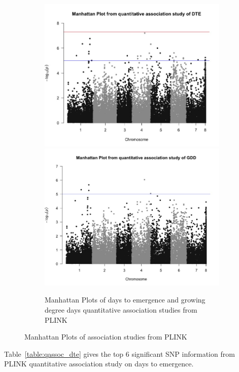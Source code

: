 \documentclass{article}
\begin{document}
\begin{figure}[!htb]
\begin{subfigure}{\textwidth}
\centering
\includegraphics[scale=.25]{mplot_qassoc_dte.jpeg}
\includegraphics[scale=.25]{mplot_qassoc_gdd.jpeg}
\caption{Manhattan Plots of days to emergence and growing degree days quantitative association studies from PLINK}
\label{fig:plink_sub2}
\end{subfigure}

\caption{Manhattan Plots of association studies from PLINK}
\label{fig:plink_res}
\end{figure}

Table~\ref{table:qassoc_dte} gives the top 6 significant SNP information from PLINK quantitative association study on days to emergence.
\end{document}
